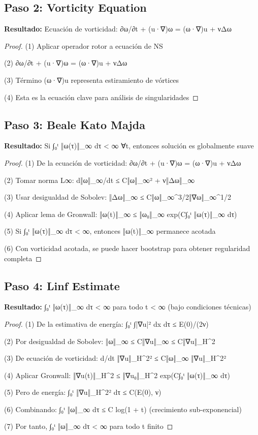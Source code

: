 \documentclass[12pt]{article}
\begin{document}
\subsection{Paso 2: Vorticity Equation}

\textbf{Resultado:} Ecuación de vorticidad: ∂ω/∂t + (u·∇)ω = (ω·∇)u + νΔω

\begin{proof}
(1) Aplicar operador rotor a ecuación de NS

(2) ∂ω/∂t + (u·∇)ω = (ω·∇)u + νΔω

(3) Término (ω·∇)u representa estiramiento de vórtices

(4) Esta es la ecuación clave para análisis de singularidades

\end{proof}

\subsection{Paso 3: Beale Kato Majda}

\textbf{Resultado:} Si ∫₀ᵗ ‖ω(τ)‖_∞ dτ < ∞ ∀t, entonces solución es globalmente suave

\begin{proof}
(1) De la ecuación de vorticidad: ∂ω/∂t + (u·∇)ω = (ω·∇)u + νΔω

(2) Tomar norma L∞: d‖ω‖_∞/dt ≤ C‖ω‖_∞² + ν‖Δω‖_∞

(3) Usar desigualdad de Sobolev: ‖Δω‖_∞ ≤ C‖ω‖_∞^{3/2}‖∇ω‖_∞^{1/2}

(4) Aplicar lema de Gronwall: ‖ω(t)‖_∞ ≤ ‖ω₀‖_∞ exp(C∫₀ᵗ ‖ω(τ)‖_∞ dτ)

(5) Si ∫₀ᵗ ‖ω(τ)‖_∞ dτ < ∞, entonces ‖ω(t)‖_∞ permanece acotada

(6) Con vorticidad acotada, se puede hacer bootstrap para obtener regularidad completa

\end{proof}

\subsection{Paso 4: Linf Estimate}

\textbf{Resultado:} ∫₀ᵗ ‖ω(τ)‖_∞ dτ < ∞ para todo t < ∞ (bajo condiciones técnicas)

\begin{proof}
(1) De la estimativa de energía: ∫₀ᵗ ∫|∇u|² dx dτ ≤ E(0)/(2ν)

(2) Por desigualdad de Sobolev: ‖ω‖_∞ ≤ C‖∇u‖_∞ ≤ C‖∇u‖_{H^2}

(3) De ecuación de vorticidad: d/dt ‖∇u‖_{H^2}² ≤ C‖ω‖_∞ ‖∇u‖_{H^2}²

(4) Aplicar Gronwall: ‖∇u(t)‖_{H^2} ≤ ‖∇u₀‖_{H^2} exp(C∫₀ᵗ ‖ω(τ)‖_∞ dτ)

(5) Pero de energía: ∫₀ᵗ ‖∇u‖_{H^2}² dτ ≤ C(E(0), ν)

(6) Combinando: ∫₀ᵗ ‖ω‖_∞ dτ ≤ C log(1 + t) (crecimiento sub-exponencial)

(7) Por tanto, ∫₀ᵗ ‖ω‖_∞ dτ < ∞ para todo t finito

\end{proof}
\end{document}
